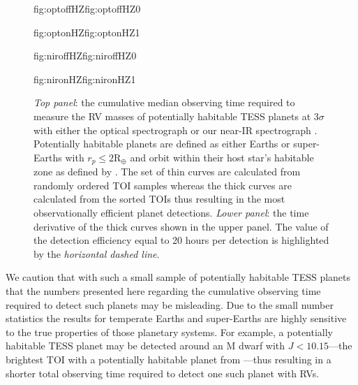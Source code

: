 \begin{figure}
  \centering
  \hspace{-\hsize}%
  \begin{ocg}{fig:optoffHZ}{fig:optoffHZ}{0}%
  \end{ocg}%
  \begin{ocg}{fig:optonHZ}{fig:optonHZ}{1}%
  \end{ocg}
  \hspace{-\hsize}%
  \begin{ocg}{fig:niroffHZ}{fig:niroffHZ}{0}%
  \end{ocg}%
  \begin{ocg}{fig:nironHZ}{fig:nironHZ}{1}%
  \end{ocg}
  \hspace{-\hsize}%
  \caption{\emph{Top panel}: the cumulative median observing time required to measure the RV masses of
    potentially habitable TESS planets at $3\sigma$ with either the optical spectrograph
     or our
    near-IR spectrograph 
    .
    Potentially habitable planets are defined as either Earths or super-Earths with
    $r_p \leq 2 \text{R}_{\oplus}$ and orbit within their host star's habitable zone as
    defined by \citep{kopparapu13}. The set of 
    thin curves are calculated from randomly ordered TOI samples whereas the thick curves are
    calculated from the sorted TOIs thus resulting in the most observationally efficient planet
    detections. \emph{Lower panel}: the time derivative of the thick curves shown in the upper panel.
    The value of the detection efficiency equal to 20 hours per detection is highlighted
    by the \emph{horizontal dashed line}.}
  \label{fig:cumulativeHZ}
\end{figure}

We caution that with such a small sample of potentially habitable TESS planets that
the numbers presented here regarding the cumulative observing time required to detect such
planets may be misleading. Due to the small number statistics the results
for temperate Earths and super-Earths are highly sensitive to the
true properties of those planetary systems. For example, a potentially
habitable TESS planet may be detected around an M dwarf with $J<10.15$---the brightest TOI with
a potentially habitable planet from ---thus resulting in a shorter total
observing time required to detect one such planet with RVs.


